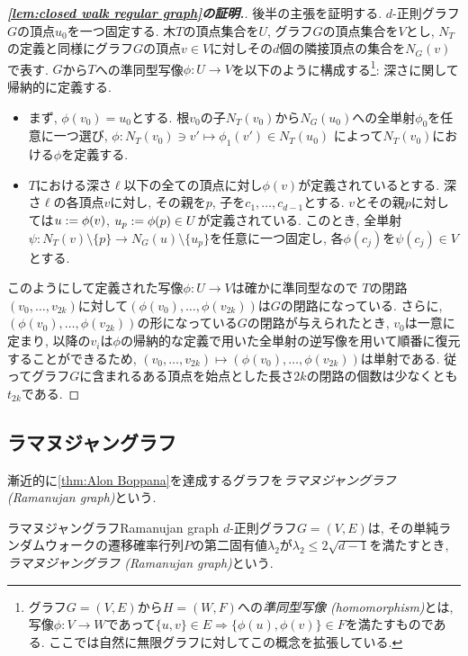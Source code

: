 \begin{proof}[\textbf{\cref{lem:closed walk regular graph}の証明.}]
    後半の主張を証明する.
    $d$-正則グラフ$G$の頂点$u_0$を一つ固定する.
    木$T$の頂点集合を$U$, グラフ$G$の頂点集合を$V$とし,
    $N_T$の定義と同様にグラフ$G$の頂点$v \in V$に対しその$d$個の隣接頂点の集合を$N_G(v)$で表す.
    $G$から$T$への準同型写像$\phi \colon U \to V$を以下のように構成する\footnote{グラフ$G=(V,E)$から$H=(W,F)$への\emph{準同型写像 (homomorphism)}とは, 写像$\phi\colon V\to W$であって$\{u,v\}\in E\Rightarrow \{\phi(u),\phi(v)\}\in F$を満たすものである. ここでは自然に無限グラフに対してこの概念を拡張している.}:
    深さに関して帰納的に定義する.
    \begin{itemize}
        \item まず, $\phi(v_0) = u_0$とする.
              根$v_0$の子$N_T(v_0)$から$N_G(u_0)$への全単射$\phi_0$を任意に一つ選び,
              $\phi\colon N_T(v_0) \ni v' \mapsto \phi_1(v') \in N_T(u_0)$
              によって$N_T(v_0)$における$\phi$を定義する.
        \item $T$における深さ$\ell$以下の全ての頂点に対し$\phi(v)$が定義されているとする. 深さ$\ell$の各頂点$v$に対し, その親を$p$, 子を$c_1,\dots,c_{d-1}$とする. $v$とその親$p$に対しては$u\mathrel{:=} \phi(v)$, $u_p\mathrel{:=} \phi(p)\in U$が定義されている. このとき, 全単射$\psi\colon N_T(v)\setminus \{p\} \to N_G(u)\setminus\{u_p\}$を任意に一つ固定し, 各$\phi(c_j)$を$\psi(c_j)\in V$とする.
    \end{itemize}
    このようにして定義された写像$\phi\colon U \to V$は確かに準同型なので
    $T$の閉路$(v_0,\dots,v_{2k})$に対して$(\phi(v_0),\dots,\phi(v_{2k}))$は$G$の閉路になっている.
    さらに, $(\phi(v_0),\dots,\phi(v_{2k}))$の形になっている$G$の閉路が与えられたとき, $v_0$は一意に定まり, 以降の$v_i$は$\phi$の帰納的な定義で用いた全単射の逆写像を用いて順番に復元することができるため, $(v_0,\dots,v_{2k}) \mapsto (\phi(v_0),\dots,\phi(v_{2k}))$は単射である.
    従ってグラフ$G$に含まれるある頂点を始点とした長さ$2k$の閉路の個数は少なくとも$t_{2k}$である.
\end{proof}


\subsection{ラマヌジャングラフ}
漸近的に\cref{thm:Alon Boppana}を達成するグラフを\emph{ラマヌジャングラフ (Ramanujan graph)}という.
\begin{definition}{ラマヌジャングラフ}{Ramanujan graph}
    $d$-正則グラフ$G=(V,E)$は, その単純ランダムウォークの遷移確率行列$P$の第二固有値$\lambda_2$が$\lambda_2 \le 2\sqrt{d-1}$を満たすとき, \emph{ラマヌジャングラフ (Ramanujan graph)}という.
\end{definition}

